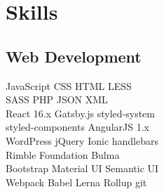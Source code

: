 \documentclass[]{deedy-resume-openfont}
\begin{document}
%
%



%
%

\begin{minipage}[t]{0.33\textwidth}


\section{Skills}
\subsection{Web Development}
JavaScript \textbullet{}   CSS \textbullet{} HTML \textbullet{} LESS \\
SASS \textbullet{} PHP \textbullet{} JSON \textbullet{} XML \\
\vspace{1pt}
React 16.x \textbullet{} Gatsby.js \textbullet{} styled-system \\
styled-components \textbullet{} AngularJS 1.x \\
WordPress \textbullet{} jQuery \textbullet{} Ionic \textbullet{} handlebars \\
\vspace{1pt}
Rimble \textbullet{} Foundation \textbullet{} Bulma \\
Bootstrap \textbullet{} Material UI \textbullet{} Semantic UI \\
\vspace{1pt}
Webpack \textbullet{} Babel \textbullet{} Lerna \textbullet{} Rollup \textbullet{} git \\
\vspace{5pt}

\end{minipage}
\end{document}
